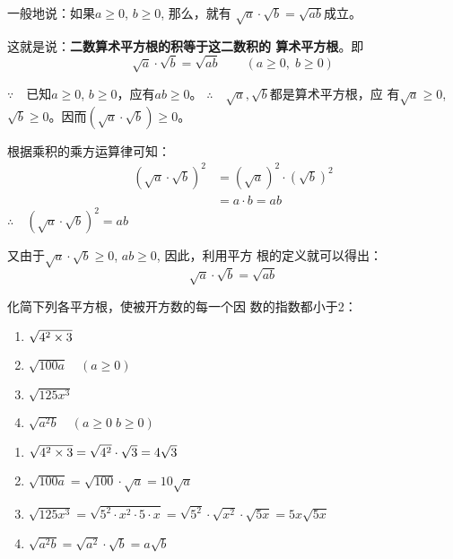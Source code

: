 一般地说：如果$a\ge 0$, $b\ge 0$, 那么，就有
$\sqrt{a}\cdot \sqrt{b}=\sqrt{ab}$成立。

这就是说：\textbf{二数算术平方根的积等于这二数积的
算术平方根}。即
\[\sqrt{a}\cdot \sqrt{b}=\sqrt{ab}\qquad (a\ge 0,\; b\ge 0)\]

\begin{note}
    $\because\quad$已知$a\ge 0$, $b\ge 0$，应有$ab\ge 0$。
$\therefore\quad \sqrt{a},\sqrt{b}$都是算术平方根，应
有$\sqrt{a}\ge 0$, $\sqrt{b}\ge 0$。因而$(\sqrt{a}\cdot \sqrt{b})\ge 0$。

根据乘积的乘方运算律可知：
\begin{align*}
    (\sqrt{a}\cdot \sqrt{b})^2 &= (\sqrt{a})^2\cdot (\sqrt{b})^2\\
    &=a\cdot b=ab \tag{算术平方根的性质}
\end{align*}
$\therefore\quad \left(\sqrt{a}\cdot \sqrt{b}\right)^2=ab$

又由于$\sqrt{a}\cdot\sqrt{b}\ge 0$, $ab\ge0$, 因此，利用平方
根的定义就可以得出：
\[\sqrt{a}\cdot\sqrt{b}=\sqrt{ab}\]
\end{note}

\begin{example}
化简下列各平方根，使被开方数的每一个因
数的指数都小于2：
\begin{multicols}{2}
\begin{enumerate}
    \item $\sqrt{4^2\times3}$
    \item $\sqrt{100a}\quad (a\ge 0)$
    \item $\sqrt{125x^3}$
    \item $\sqrt{a^2b}\quad (a\ge 0\; b\ge 0)$
\end{enumerate}
\end{multicols}
\end{example}

\begin{solution}
\begin{enumerate}
\item $\sqrt{4^2\times3}=\sqrt{4^2}\cdot \sqrt{3}=4\sqrt{3}$
    \item $\sqrt{100a}=\sqrt{100}\cdot \sqrt{a}=10\sqrt{a} $
    \item $\sqrt{125x^3}=\sqrt{5^2\cdot x^2\cdot 5\cdot x}=\sqrt{5^2}\cdot \sqrt{x^2}\cdot \sqrt{5x}=5x\sqrt{5x}$
    \item $\sqrt{a^2b}=\sqrt{a^2}\cdot \sqrt{b}=a\sqrt{b} $
\end{enumerate}
\end{solution}

